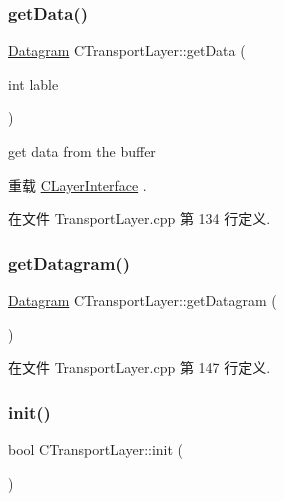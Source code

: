 \mbox{\label{class_c_transport_layer_a9396850eb026ff070c06bfc25dd4979c}} 
\subsubsection{\texorpdfstring{get\+Data()}{getData()}}
{\footnotesize\ttfamily \hyperlink{class_datagram}{Datagram} C\+Transport\+Layer\+::get\+Data (\begin{DoxyParamCaption}\item[{int}]{lable }\end{DoxyParamCaption})\hspace{0.3cm}{\ttfamily [virtual]}}

get data from the buffer 

重载 \hyperlink{class_c_layer_interface_a804d604d3e0032e676d02fd5d369607e}{C\+Layer\+Interface} .



在文件 Transport\+Layer.\+cpp 第 134 行定义.

\mbox{\label{class_c_transport_layer_a6ee36bbbfab91014087ed88923129372}} 
\subsubsection{\texorpdfstring{get\+Datagram()}{getDatagram()}}
{\footnotesize\ttfamily \hyperlink{class_datagram}{Datagram} C\+Transport\+Layer\+::get\+Datagram (\begin{DoxyParamCaption}{ }\end{DoxyParamCaption})}



在文件 Transport\+Layer.\+cpp 第 147 行定义.

\mbox{\label{class_c_transport_layer_ac81e9405db824a73a6092ed0b05a217b}} 
\subsubsection{\texorpdfstring{init()}{init()}}
{\footnotesize\ttfamily bool C\+Transport\+Layer\+::init (\begin{DoxyParamCaption}{ }\end{DoxyParamCaption})}



